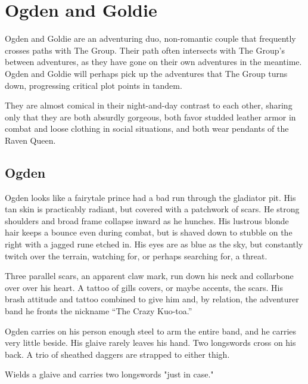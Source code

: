 \section{Ogden and Goldie}\label{sec:ogdenAndGoldie}

Ogden and Goldie are an adventuring duo, non-romantic couple that frequently crosses paths with
The Group.
Their path often intersects with The Group's between adventures, as they have gone on their own
adventures in the meantime.
Ogden and Goldie will perhaps pick up the adventures that The Group turns down, progressing
critical plot points in tandem.

They are almost comical in their night-and-day contrast to each other, sharing only that they are
both absurdly gorgeous, both favor studded leather armor in combat and loose clothing in social
situations, and both wear pendants of the Raven Queen.

\subsection{Ogden}\label{subsec:ogden}

  \begin{aloud}
  \label{description:ogden}
  Ogden looks like a fairytale prince had a bad run through the gladiator pit.
  His tan skin is practicably radiant, but covered with a patchwork of scars.
  He strong shoulders and broad frame collapse inward as he hunches.
  His lustrous blonde hair keeps a bounce even during combat, but is shaved down to stubble on
    the right with a jagged rune etched in.
  His eyes are as blue as the sky, but constantly twitch over the terrain, watching for, or perhaps
    searching for, a threat.

  Three parallel scars, an apparent claw mark, run down his neck and collarbone over over his heart.
  A tattoo of gills covers, or maybe accents, the scars.
  His brash attitude and tattoo combined to give him and, by relation,
    the adventurer band he fronts the nickname ``The Crazy Kuo-toa.''

  Ogden carries on his person enough steel to arm the entire band,
    and he carries very little beside.
  His glaive rarely leaves his hand.
  Two longswords cross on his back.
  A trio of sheathed daggers are strapped to either thigh.
  \end{aloud}

Wields a glaive and carries two longswords "just in case."

